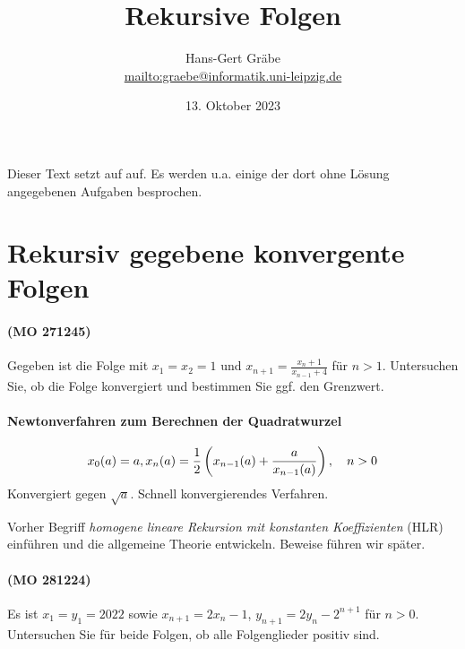 \documentclass[11pt,a4paper]{article}
\title{Rekursive Folgen}
\author{Hans-Gert Gräbe\\[8pt]
\url{mailto:graebe@informatik.uni-leipzig.de}}
\date{13. Oktober 2023}
\begin{document}
\maketitle

Dieser Text setzt auf \cite{S} auf. Es werden u.a. einige der dort ohne Lösung
angegebenen Aufgaben besprochen. 

\section*{Rekursiv gegebene konvergente Folgen}

\paragraph{(MO 271245)}
Gegeben ist die Folge mit $x_1=x_2=1$ und $x_{n+1}=\frac{x_n+1}{x_{n-1}+4}$
für $n>1$.  Untersuchen Sie, ob die Folge konvergiert und bestimmen Sie ggf.
den Grenzwert.

\begin{loesung}
  
\end{loesung}


\paragraph{Newtonverfahren zum Berechnen der Quadratwurzel}
\begin{gather*}
  x_0(a)=a, x_n(a)=\frac12\left(x_{n-1}(a)+\frac{a}{x_{n-1}(a)}\right),\quad n>0
\end{gather*}
Konvergiert gegen $\sqrt{a}$. Schnell konvergierendes Verfahren. 


Vorher Begriff \emph{homogene lineare Rekursion mit konstanten Koeffizienten}
(HLR) einführen und die allgemeine Theorie entwickeln. Beweise führen wir
später.

\paragraph{(MO 281224)}
Es ist $x_1=y_1=2022$ sowie $x_{n+1}=2x_n-1$, $y_{n+1}=2y_n-2^{n+1}$ für
$n>0$.  Untersuchen Sie für beide Folgen, ob alle Folgenglieder positiv sind.
\end{document}
